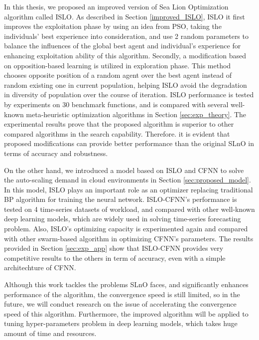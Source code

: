 \documentclass[../main.tex]{subfiles}
\begin{document}
In this thesis, we proposed an improved version of Sea Lion Optimization algorithm called ISLO. As described in Section \ref{improved_ISLO}, ISLO it first improves the exploitation phase by using an idea from PSO, taking the individuals' best experience into consideration, and use 2 random parameters to balance the influences of the global best agent and individual's experience for enhancing exploitation ability of this algorithm. Secondly, a modification based on opposition-based learning is utilized in exploration phase. This method chooses opposite position of a random agent over the best agent instead of random existing one in current population, helping ISLO avoid the degradation in diversity of population over the course of iteration. ISLO performance is tested by experiments on 30 benchmark functions, and is compared with several well-known meta-heuristic optimization algorithms in Section \ref{sec:exp_theory}. The experimental results prove that the proposed algorithm is superior to other compared algorithms in the search capability. Therefore. it is evident that proposed modifications can provide better performance than the original SLnO in terms of accuracy and robustness.

On the other hand, we introduced a model based on ISLO and CFNN to solve the auto-scaling demand in cloud environments in Section \ref{sec:proposed_model}. In this model, ISLO plays an important role as an optimizer replacing traditional BP algorithm for training the neural network. ISLO-CFNN's performance is tested on 4 time-series datasets of workload, and compared with other well-known deep learning models, which are widely used in solving time-series forecasting problem. Also, ISLO's optimizing capacity is experimented again and compared with other swarm-based algorithm in optimizing CFNN's parameters. The results provided in Section \ref{sec:exp_app} show that ISLO-CFNN provides very competitive results to the others in term of accuracy, even with a simple architechture of CFNN. 

Although this work tackles the problems SLnO faces, and significantly enhances performance of the algorithm, the convergence speed is still limited, so in the future, we will conduct research on the issue of accelerating the convergence speed of this algorithm. Furthermore, the improved algorithm will be applied to tuning hyper-parameters problem in deep learning models, which takes huge amount of time and resources.
\end{document}
